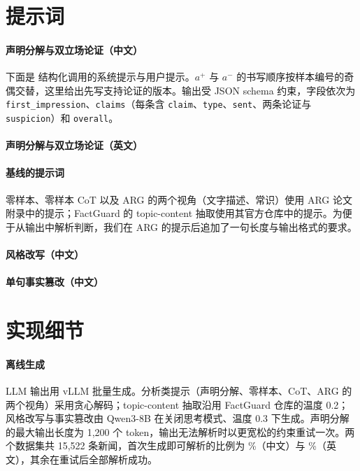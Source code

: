 \section{提示词}\label{app:prompt}

\paragraph{声明分解与双立场论证（中文）}
下面是 \method{} 结构化调用的系统提示与用户提示。$a^+$ 与 $a^-$ 的书写顺序按样本编号的奇偶交替，这里给出先写支持论证的版本。输出受 JSON schema 约束，字段依次为 \texttt{first\_impression}、\texttt{claims}（每条含 \texttt{claim}、\texttt{type}、\texttt{sent}、两条论证与 \texttt{suspicion}）和 \texttt{overall}。



\paragraph{声明分解与双立场论证（英文）}



\paragraph{基线的提示词}
零样本、零样本 CoT 以及 ARG 的两个视角（文字描述、常识）使用 ARG 论文附录中的提示\citep{hu2024bad}；FactGuard 的 topic-content 抽取使用其官方仓库中的提示\citep{he2026factguard}。为便于从输出中解析判断，我们在 ARG 的提示后追加了一句长度与输出格式的要求。

\paragraph{风格改写（中文）}



\paragraph{单句事实篡改（中文）}



\section{实现细节}\label{app:impl}

\paragraph{离线生成}
LLM 输出用 vLLM\citep{kwon2023vllm} 批量生成。分析类提示（声明分解、零样本、CoT、ARG 的两个视角）采用贪心解码；topic-content 抽取沿用 FactGuard 仓库的温度 0.2；风格改写与事实篡改由 Qwen3-8B 在关闭思考模式、温度 0.3 下生成。声明分解的最大输出长度为 1{,}200 个 token，输出无法解析时以更宽松的约束重试一次。两个数据集共 15{,}522 条新闻，首次生成即可解析的比例为 \%（中文）与 \%（英文），其余在重试后全部解析成功。

